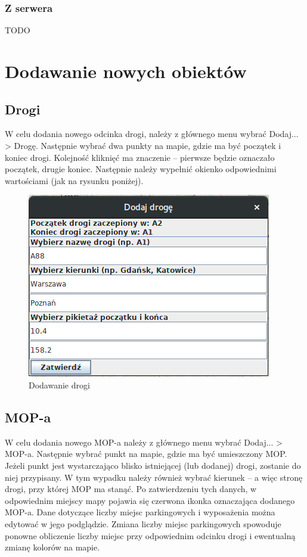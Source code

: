 \documentclass[10pt,paper=a4 BCOR0, DIV15, titlepage=false, oneside]{scrbook} %
\begin{document}
        \subsection{Z serwera} TODO

        \chapter*{Dodawanie nowych obiektów}
        \setcounter{section}{0}
        \addtocounter{chapter}{1}
        \section{Drogi}
        W celu dodania nowego odcinka drogi, należy z głównego menu wybrać
        Dodaj... > Drogę. Następnie wybrać dwa punkty na mapie, gdzie ma być
        początek i koniec drogi. Kolejność kliknięć ma znaczenie -- pierwsze
        będzie oznaczało początek, drugie koniec. Następnie należy wypełnić
        okienko odpowiednimi wartościami (jak na rysunku poniżej). 

       \begin{figure}[ht]
        \centering
       \includegraphics[width=.3\textwidth]{dodawanie_drogi.png}
        \caption{Dodawanie drogi}
      \end{figure}

      \section{MOP-a}
      W celu dodania nowego MOP-a należy z głównego menu wybrać Dodaj... >
      MOP-a. Następnie wybrać punkt na mapie, gdzie ma być umieszczony MOP.
      Jeżeli punkt jest wystarczająco blisko istniejącej (lub dodanej) drogi,
      zostanie do niej przypisany. W tym wypadku należy również wybrać kierunek
      -- a więc stronę drogi, przy której MOP ma stanąć. Po zatwierdzeniu tych
      danych, w odpowiednim miejscy mapy pojawia się czerwona ikonka
      oznaczająca dodanego MOP-a. Dane dotyczące liczby miejsc parkingowych i
      wyposażenia można edytować w jego podglądzie. Zmiana liczby miejsc
      parkingowych spowoduje ponowne obliczenie liczby miejsc przy odpowiednim
      odcinku drogi i ewentualną zmianę kolorów na mapie. 
\end{document}

